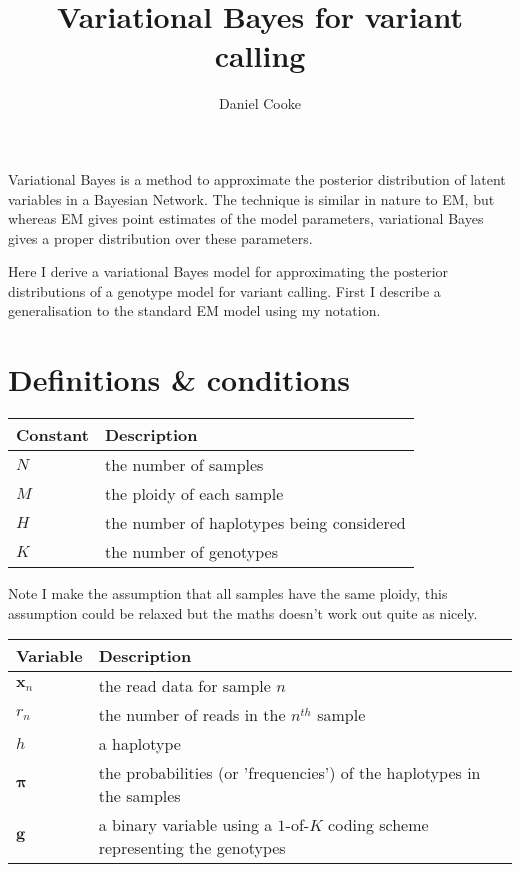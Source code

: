 \documentclass{article}
\title{Variational Bayes for variant calling}
\author{Daniel Cooke}
\date{}
\begin{document}
\maketitle

Variational Bayes is a method to approximate the posterior distribution of latent variables in a Bayesian Network. The technique is similar in nature to EM, but whereas EM gives point estimates of the model parameters, variational Bayes gives a proper distribution over these parameters.

Here I derive a variational Bayes model for approximating the posterior distributions of a genotype model for variant calling. First I describe a generalisation to the standard EM model using my notation.

\section{Definitions \& conditions}

\begin{center}
\begin{tabular}{ll}
Constant & Description \\
\hline
$N$ & the number of samples \\
$M$ & the ploidy of each sample \\
$H$ & the number of haplotypes being considered \\
$K$ & the number of genotypes \\
\hline
\end{tabular}
\end{center}

Note I make the assumption that all samples have the same ploidy, this assumption could be relaxed but the maths doesn't work out quite as nicely.

\begin{center}
\begin{tabular}{ll}
Variable & Description \\
\hline
$\boldsymbol{x}_n$ & the read data for sample $n$ \\
$r_n$ & the number of reads in the $n^{th}$ sample \\
$h$ & a haplotype \\
$\boldsymbol{\pi}$ & the probabilities (or 'frequencies') of the haplotypes in the samples \\
$\boldsymbol{g}$ & a binary variable using a $1$-of-$K$ coding scheme representing the genotypes \\
\hline
\end{tabular}
\end{center}
\end{document}
